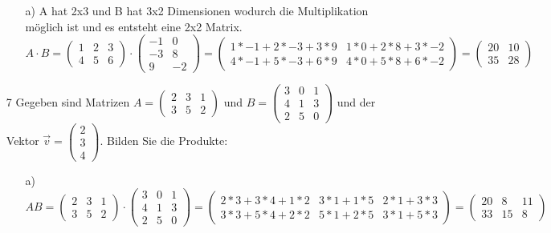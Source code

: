 \documentclass{article}
\begin{document}
\begin{itemize}
\begin{itemize}
			\item[a)]{A hat 2x3 und B hat 3x2 Dimensionen wodurch die Multiplikation möglich ist und es entsteht eine 2x2 Matrix. $A\cdot B=\begin{pmatrix} 1 & 2 & 3 \\ 4 & 5 & 6 \end{pmatrix}\cdot \begin{pmatrix} -1 & 0 \\ -3 & 8 \\ 9 & -2 \end{pmatrix}=\begin{pmatrix} 1*-1+2*-3+3*9 & 1*0+2*8+3*-2 \\ 4*-1+5*-3+6*9 & 4*0+5*8+6*-2 \end{pmatrix}=\begin{pmatrix} 20 & 10 \\ 35 & 28 \end{pmatrix}$}
		\end{itemize}
		\item[7]{Gegeben sind Matrizen $A=\begin{pmatrix} 2 & 3 & 1 \\ 3 & 5 & 2 \end{pmatrix}$ und $B=\begin{pmatrix} 3 & 0 & 1 \\ 4 & 1 & 3 \\ 2 & 5 & 0 \end{pmatrix}$ und der Vektor $\vec{v}=\begin{pmatrix} 2 \\ 3 \\ 4 \end{pmatrix}$. Bilden Sie die Produkte:}
		\begin{itemize}
			\item[a)]{$AB=\begin{pmatrix} 2 & 3 & 1 \\ 3 & 5 & 2 \end{pmatrix}\cdot \begin{pmatrix} 3 & 0 & 1 \\ 4 & 1 & 3 \\ 2 & 5 & 0 \end{pmatrix}=\begin{pmatrix} 2*3+3*4+1*2 & 3*1+1*5 & 2*1+3*3 \\ 3*3+5*4+2*2 & 5*1+2*5 & 3*1+5*3 \end{pmatrix}=\begin{pmatrix} 20 & 8 & 11 \\ 33 & 15 & 8 \end{pmatrix}$}

\end{itemize}
\end{itemize}
\end{document}
